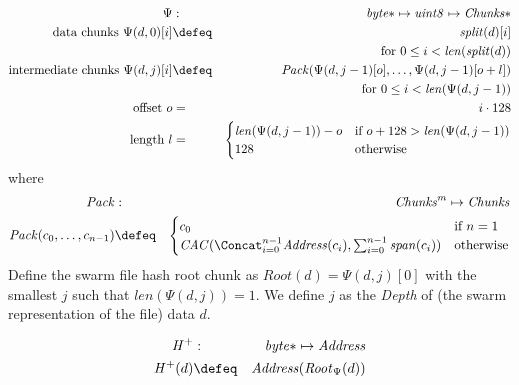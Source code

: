 \begin{definition}
\label{def:lambda}
\begin{eqnarray}
\Psi&:&\mathit{byte}{*}\mapsto\mathit{uint8}\mapsto\mathit{Chunks}{*}\\
\text{data chunks }\Psi(d,0)[i] &\defeq&\mathit{split}(d)[i]\\ 
&&\text{for }0\leq i< \mathit{len}(\mathit{split}(d))\\
\text{intermediate chunks }\Psi(d,j)[i]&\defeq&\mathit{Pack}( 
\Psi(d,j-1)[o],\ldots,\Psi(d,j-1)[o+l])\\
&&\text{for }0\leq i<\mathit{len}(\Psi(d,j-1))\\
\text{offset }o&=&i\cdot 128\\
\text{length }l&=&\begin{cases}
\mathit{len}(\Psi(d,j-1))-o&\text{if }o+128>\mathit{len}(\Psi(d,j-1))\\
128&\text{otherwise}
\end{cases}
\end{eqnarray}
where
\begin{eqnarray}
\mathit{Pack}&:&\mathit{Chunks}^m\mapsto\mathit{Chunks}\\
\mathit{Pack}(c_0,\ldots ,c_{n-1})&\defeq&
\begin{cases}
c_0&\text{if }n=1\\
\mathit{CAC}(\Concat_{i=0}^{n-1}\mathit{Address}(c_i),\sum_{i=0}^{n-1}\mathit{span}(c_i))&\text{otherwise}
\end{cases}
\end{eqnarray}
Define the swarm file hash root chunk as $\mathit{Root}(d) = \Psi(d,j)[0]$ with the smallest $j$ such that $\mathit{len}(\Psi(d,j))=1$. We define $j$ as the \emph{Depth} of (the swarm representation of the file) data $d$.  
\end{definition}

\begin{definition}
\label{def:swarm-hash}
\begin{eqnarray}
\mathit{H}^{+}&:&\mathit{byte}{*}\mapsto\mathit{Address}\\
\mathit{H}^{+}(d)&\defeq&\mathit{Address}(\mathit{Root}_{\Psi}(d))
\end{eqnarray}
\end{definition}

